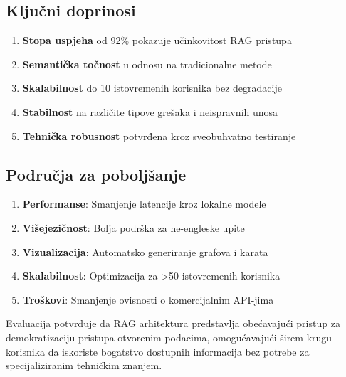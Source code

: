 \subsection{Ključni doprinosi}

\begin{enumerate}
    \item \textbf{Stopa uspjeha} od 92\% pokazuje učinkovitost RAG pristupa
    \item \textbf{Semantička točnost} u odnosu na tradicionalne metode
    \item \textbf{Skalabilnost} do 10 istovremenih korisnika bez degradacije
    \item \textbf{Stabilnost} na različite tipove grešaka i neispravnih unosa
    \item \textbf{Tehnička robusnost} potvrđena kroz sveobuhvatno testiranje
\end{enumerate}

\subsection{Područja za poboljšanje}

\begin{enumerate}
    \item \textbf{Performanse}: Smanjenje latencije kroz lokalne modele
    \item \textbf{Višejezičnost}: Bolja podrška za ne-engleske upite
    \item \textbf{Vizualizacija}: Automatsko generiranje grafova i karata
    \item \textbf{Skalabilnost}: Optimizacija za >50 istovremenih korisnika
    \item \textbf{Troškovi}: Smanjenje ovisnosti o komercijalnim API-jima
\end{enumerate}

Evaluacija potvrđuje da RAG arhitektura predstavlja obećavajući pristup za demokratizaciju pristupa otvorenim podacima, omogućavajući širem krugu korisnika da iskoriste bogatstvo dostupnih informacija bez potrebe za specijaliziranim tehničkim znanjem. 
